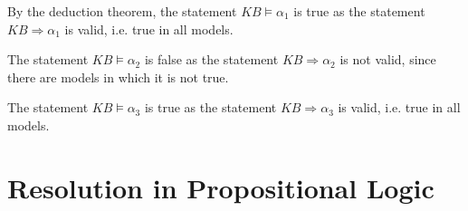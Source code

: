 \begin{enumerate}
By the deduction theorem, the statement $\textit{KB} \vDash \alpha_1$ is true as the statement $\textit{KB} \Rightarrow \alpha_1$ is valid, i.e. true in all models.

The statement $\textit{KB} \vDash \alpha_2$ is false as the statement $\textit{KB} \Rightarrow \alpha_2$ is not valid, since there are models in which it is not true.

The statement $\textit{KB} \vDash \alpha_3$ is true as the statement $\textit{KB} \Rightarrow \alpha_3$ is valid, i.e. true in all models.
\end{enumerate}

\section{Resolution in Propositional Logic}

